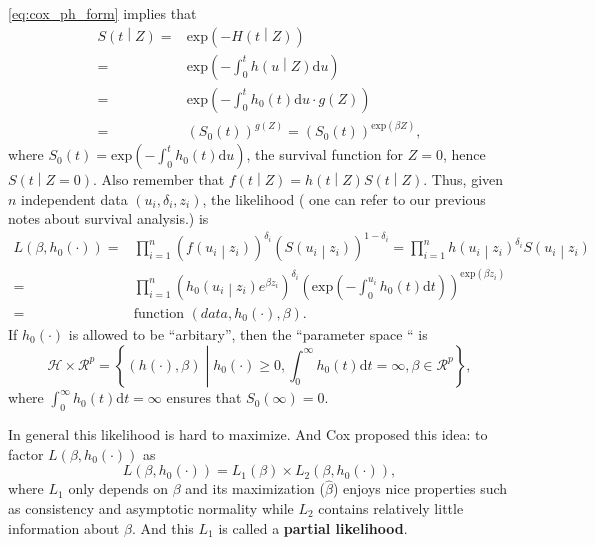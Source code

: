 \documentclass[a4paper,12pt]{article}
\begin{document}
\eqref{eq:cox_ph_form} implies that
\[
  \begin{aligned}
    S\left(t\middle|Z\right)
    =& \mathrm{exp}\left(-H\left(t\middle|Z\right)\right)    \\
    =& \mathrm{exp}\left(-\int_0^th\left(u\middle|Z\right)\mathrm{d}u\right)    \\
    =& \mathrm{exp}\left(-\int_0^th_0\left(t\right)\mathrm{d}u \cdot g\left(Z\right)\right)    \\
    =& \left(S_0\left(t\right)\right)^{g\left(Z\right)}
    = \left(S_0\left(t\right)\right)^{\mathrm{exp}\left(\beta Z\right)}
    ,
  \end{aligned}
\]
where $S_0\left(t\right) = \mathrm{exp}\left( - \int_0^t h_0\left(t\right)\mathrm{d}u\right)$, the survival function for $Z = 0$, hence $S\left(t\middle|Z = 0\right)$. Also remember that $f\left(t\middle|Z\right) = h\left(t\middle|Z\right) S\left(t\middle|Z\right)$. Thus, given $n$ independent data $\left(u_i, \delta_i, z_i\right)$, the likelihood ({\color{blue} one can refer to our previous notes about survival analysis.}) is
\[
  \begin{aligned}
    L\left(\beta, h_0\left(\cdot\right)\right)
    =& \prod\limits_{i = 1}^n
    \left(
      f\left(u_i\middle|z_i\right)
    \right)^{\delta_i}
    \left(
      S\left(u_i\middle|z_i\right)
    \right)^{1 - \delta_i}
    = \prod\limits_{i = 1}^n
    h\left(u_i\middle|z_i\right)^{\delta_i}
    S\left(u_i\middle|z_i\right)    \\
    =& \prod\limits_{i = 1}^n
    \left(
      h_0\left(u_i\middle|z_i\right)
      e^{\beta z_i}
    \right)^{\delta_i}
    \left(
      \mathrm{exp}\left(-\int_0^{u_i}h_0\left(t\right)\mathrm{d}t\right)
    \right)^{\mathrm{exp}\left(\beta z_i\right)}    \\
    =& \text{function $\left(data, h_0\left(\cdot\right), \beta\right)$}.
  \end{aligned}
\]
If $h_0\left(\cdot\right)$ is allowed to be ``arbitary'', then the ``parameter space `` is
\[
  \mathcal{H} \times \mathcal{R}^p
  = \left\{
    \left(h\left(\cdot\right), \beta\right)
    \middle|
    h_0\left(\cdot\right) \geq 0,
    \int_0^\infty h_0\left(t\right)\mathrm{d}t = \infty,
    \beta \in \mathcal{R}^p
  \right\}
  ,
\]
where $\int_0^\infty h_0\left(t\right)\mathrm{d}t = \infty$ ensures that $S_0\left(\infty\right) = 0$.
\par
In general this likelihood is hard to maximize. And Cox proposed this idea: to factor $L\left(\beta, h_0\left(\cdot\right)\right)$ as
\[
  L\left(\beta, h_0\left(\cdot\right)\right)
  = L_1\left(\beta\right)
  \times
  L_2\left(\beta, h_0\left(\cdot\right)\right)
  ,
\]
where $L_1$ only depends on $\beta$ and its maximization ($\hat{\beta}$) enjoys nice properties such as consistency and asymptotic normality while $L_2$ contains relatively little information about $\beta$. And this $L_1$ is called a \textbf{partial likelihood}.
\end{document}
